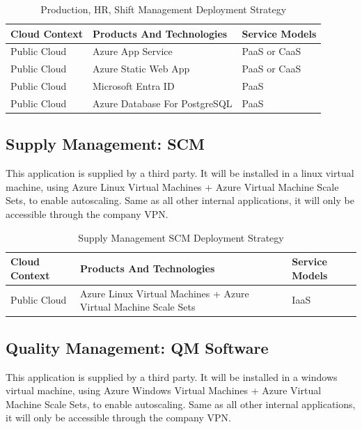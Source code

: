\documentclass{llncs}
\begin{document}
\begin{table}[h!]
    \centering
    \begin{tabular}{lll}
        \hline
        \textbf{Cloud Context} & \textbf{Products And Technologies} & \textbf{Service Models} \\
        \hline
        Public Cloud           & Azure App Service                  & PaaS or CaaS            \\
        \hline
        Public Cloud           & Azure Static Web App               & PaaS or CaaS            \\

        \hline
        Public Cloud           & Microsoft Entra ID                 & PaaS                    \\
        \hline
        Public Cloud           & Azure Database For PostgreSQL      & PaaS                    \\
        \hline
    \end{tabular}
    \caption{Production, HR, Shift Management Deployment Strategy}
\end{table}

\subsection{Supply Management: SCM}
This application is supplied by a third party. It will be installed in a linux virtual machine, using Azure Linux Virtual Machines + Azure Virtual Machine Scale Sets, to enable autoscaling.
Same as all other internal applications, it will only be accessible through the company VPN.\\

\begin{table}[h!]
    \centering
    \begin{tabular}{lll}
        \hline
        \textbf{Cloud Context} & \textbf{Products And Technologies}                              & \textbf{Service Models} \\
        \hline
        Public Cloud           & Azure Linux Virtual Machines + Azure Virtual Machine Scale Sets & IaaS                    \\
    \end{tabular}
    \caption{Supply Management SCM Deployment Strategy}
\end{table}

\subsection{Quality Management: QM Software}
This application is supplied by a third party. It will be installed in a windows virtual machine, using Azure Windows Virtual Machines + Azure Virtual Machine Scale Sets, to enable autoscaling.
Same as all other internal applications, it will only be accessible through the company VPN.\\
\end{document}
